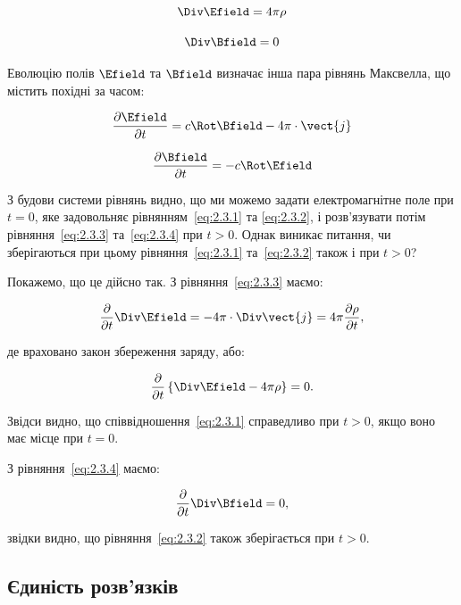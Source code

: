 \begin{equation}
\Div \Efield = 4\pi\rho \label{eq:2.3.1}
\end{equation}

\begin{equation}
\Div \Bfield = 0 \label{eq:2.3.2}
\end{equation}

Еволюцію полів \( \Efield \) та \( \Bfield \) визначає інша пара рівнянь Максвелла, що містить похідні за часом:

\begin{equation}
\frac{\partial \Efield}{\partial t} = c \Rot \Bfield - 4\pi \cdot \vect{j} \label{eq:2.3.3}
\end{equation}

\begin{equation}
\frac{\partial \Bfield}{\partial t} = -c \Rot \Efield \label{eq:2.3.4}
\end{equation}

З будови системи рівнянь видно, що ми можемо задати електромагнітне поле при \( t = 0 \), яке задовольняє рівнянням~\eqref{eq:2.3.1} та
\eqref{eq:2.3.2}, і розв’язувати потім рівняння~\eqref{eq:2.3.3} та~\eqref{eq:2.3.4} при \( t > 0 \). Однак виникає питання, чи зберігаються при цьому
рівняння~\eqref{eq:2.3.1} та~\eqref{eq:2.3.2} також і при \( t > 0 \)?

Покажемо, що це дійсно так. З рівняння~\eqref{eq:2.3.3} маємо:

\[
\frac{\partial}{\partial t} \Div \Efield = -4\pi \cdot \Div \vect{j} = 4\pi \frac{\partial \rho}{\partial t},
\]

де враховано закон збереження заряду, або:

\[
\frac{\partial}{\partial t} \left\{ \Div \Efield - 4\pi\rho \right\} = 0.
\]

Звідси видно, що співвідношення~\eqref{eq:2.3.1} справедливо при \( t > 0 \), якщо воно має місце при \( t = 0 \).

З рівняння~\eqref{eq:2.3.4} маємо:

\[
\frac{\partial}{\partial t} \Div \Bfield = 0,
\]

звідки видно, що рівняння~\eqref{eq:2.3.2} також зберігається при \( t > 0 \).

\subsection*{Єдиність розв’язків}




